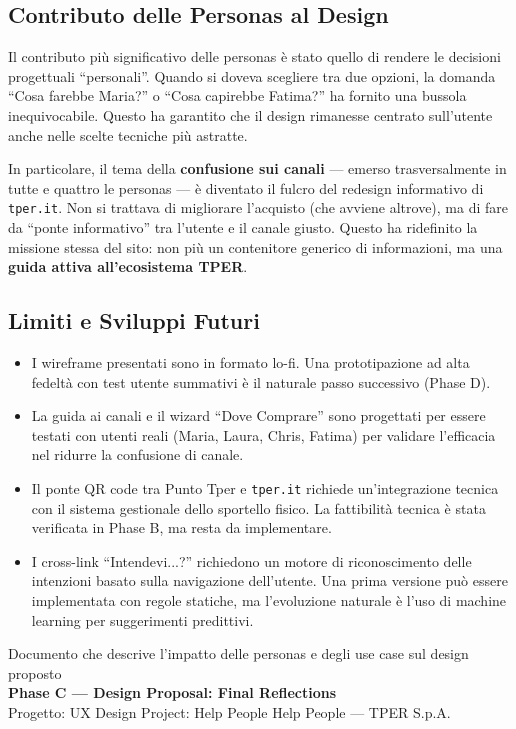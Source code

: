 \documentclass[11pt,a4paper]{article}
\begin{document}
\subsection{Contributo delle Personas al Design}

Il contributo pi\`u significativo delle personas \`e stato quello di rendere le decisioni progettuali ``personali''. Quando si doveva scegliere tra due opzioni, la domanda ``Cosa farebbe Maria?'' o ``Cosa capirebbe Fatima?'' ha fornito una bussola inequivocabile. Questo ha garantito che il design rimanesse centrato sull'utente anche nelle scelte tecniche pi\`u astratte.

In particolare, il tema della \textbf{confusione sui canali} --- emerso trasversalmente in tutte e quattro le personas --- \`e diventato il fulcro del redesign informativo di \texttt{tper.it}. Non si trattava di migliorare l'acquisto (che avviene altrove), ma di fare da ``ponte informativo'' tra l'utente e il canale giusto. Questo ha ridefinito la missione stessa del sito: non pi\`u un contenitore generico di informazioni, ma una \textbf{guida attiva all'ecosistema TPER}.

\subsection{Limiti e Sviluppi Futuri}

\begin{itemize}
    \item I wireframe presentati sono in formato lo-fi. Una prototipazione ad alta fedelt\`a con test utente summativi \`e il naturale passo successivo (Phase D).
    \item La guida ai canali e il wizard ``Dove Comprare'' sono progettati per essere testati con utenti reali (Maria, Laura, Chris, Fatima) per validare l'efficacia nel ridurre la confusione di canale.
    \item Il ponte QR code tra Punto Tper e \texttt{tper.it} richiede un'integrazione tecnica con il sistema gestionale dello sportello fisico. La fattibilit\`a tecnica \`e stata verificata in Phase B, ma resta da implementare.
    \item I cross-link ``Intendevi...?'' richiedono un motore di riconoscimento delle intenzioni basato sulla navigazione dell'utente. Una prima versione pu\`o essere implementata con regole statiche, ma l'evoluzione naturale \`e l'uso di machine learning per suggerimenti predittivi.
\end{itemize}

\vspace{0.5cm}

\begin{center}
{\color{secondaryColor}\small
Documento che descrive l'impatto delle personas e degli use case sul design proposto \\[4pt]
\textbf{Phase C --- Design Proposal: Final Reflections} \\[4pt]
Progetto: UX Design Project: Help People Help People --- TPER S.p.A.}
\end{center}
\end{document}
